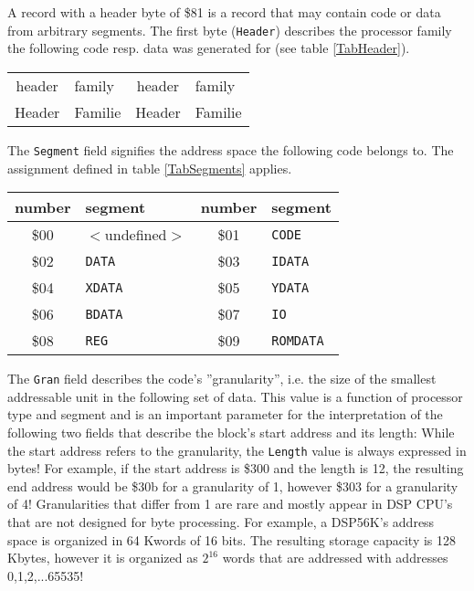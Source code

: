 \documentclass[12pt,twoside]{report}
\newcommand{\tty}[1]{{\tt #1}}
\begin{document}
A record with a header byte of \$81 is a record that may contain code
or data from arbitrary segments.  The first byte (\tty{Header}) describes
the processor family the following code resp. data was generated for (see
table \ref{TabHeader}).
\begin{table*}[htbp]
\begin{center}\begin{tabular}{|c|l||c|l|}
\hline
header  & family & header  & family \\
Header & Familie & Header & Familie \\
\hline
\hline

\end{tabular}\end{center}
\caption{Header Bytes for the Different Processor
         Families\label{TabHeader}}
\end{table*}
The \tty{Segment} field signifies the address space the following code
belongs to.  The assignment defined in table \ref{TabSegments} applies.
\begin{table*}[htbp] 
\begin{center}\begin{tabular}{|c|l||c|l|}
\hline
number  & segment               & number  & segment \\
\hline
\hline
\$00    & $<$undefined$>$       & \$01    & \tty{CODE} \\
\$02    & \tty{DATA}            & \$03    & \tty{IDATA} \\
\$04    & \tty{XDATA}           & \$05    & \tty{YDATA} \\
\$06    & \tty{BDATA}           & \$07    & \tty{IO} \\              
\$08    & \tty{REG}             & \$09    & \tty{ROMDATA} \\
\hline              
\end{tabular}\end{center}
\caption{Codings of the {\tt Segment} Field\label{TabSegments}
         \label{TabSegmentNums}}
\end{table*}
The \tty{Gran} field describes the code's ''granularity'', i.e. the size of
the smallest addressable unit in the following set of data.  This
value is a function of processor type and segment and is an important
parameter for the interpretation of the following two fields that
describe the block's start address and its length: While the start
address refers to the granularity, the \tty{Length} value is always
expressed in bytes!  For example, if the start address is \$300 and
the length is 12, the resulting end address would be \$30b for a
granularity of 1, however \$303 for a granularity of 4!  Granularities
that differ from 1 are rare and mostly appear in DSP CPU's that are
not designed for byte processing.  For example, a DSP56K's address
space is organized in 64 Kwords of 16 bits.  The resulting storage
capacity is 128 Kbytes, however it is organized as $2^{16}$ words that
are addressed with addresses 0,1,2,...65535!
\end{document}
